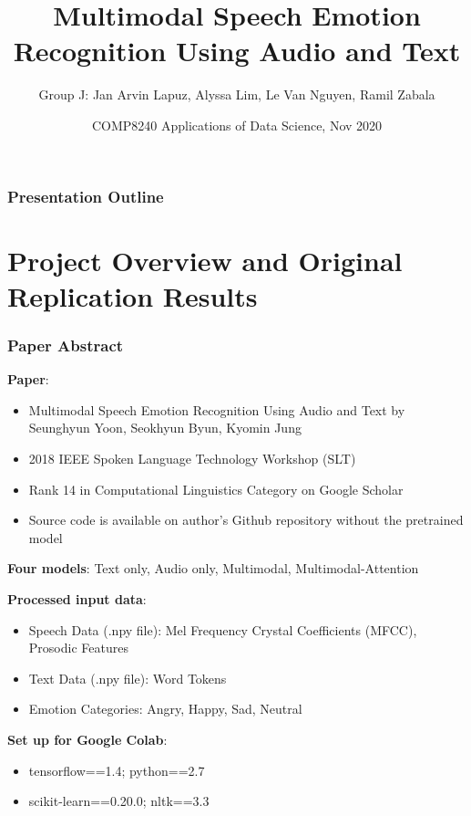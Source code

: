 \documentclass{beamer}
\title %
{Multimodal Speech Emotion Recognition Using Audio and Text}
\author[Group J] %
{Group J: Jan Arvin Lapuz, Alyssa Lim, Le Van Nguyen, Ramil Zabala}
\date[Nov 2020] %
{COMP8240 Applications of Data Science, Nov 2020}
\begin{document}
\frame{\titlepage}

\begin{frame}
\frametitle{Presentation Outline}
\tableofcontents
\end{frame}


\section{Project Overview and Original Replication Results}


\begin{frame}
\frametitle{Paper Abstract}
\textbf{Paper}:
	\begin{itemize}
 	   \item Multimodal Speech Emotion Recognition Using Audio and Text by Seunghyun Yoon, 	Seokhyun Byun, Kyomin Jung
 	   \item 2018 IEEE Spoken Language Technology Workshop (SLT)
 	   \item Rank 14 in Computational Linguistics Category on Google Scholar
 	   \item Source code is available on author's Github repository without the pretrained model
	\end{itemize}

\textbf{Four models}: Text only, Audio only, Multimodal, Multimodal-Attention 

\textbf{Processed input data}:
    \begin{itemize}
        \item Speech Data (.npy file): Mel Frequency Crystal Coefficients (MFCC), Prosodic Features
        \item Text Data (.npy file): Word Tokens
        \item Emotion Categories: Angry, Happy, Sad, Neutral
    \end{itemize}
    
\textbf{Set up for Google Colab}:
    \begin{itemize}
        \item tensorflow==1.4; python==2.7
        \item scikit-learn==0.20.0; nltk==3.3
        
    \end{itemize}
\end{frame}
\end{document}
